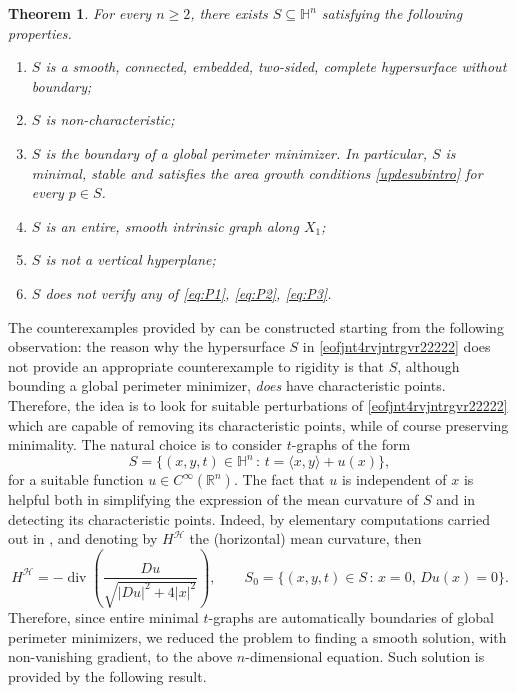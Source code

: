 \documentclass[11pt]{amsart}
\renewcommand{\geq}{\geqslant}
\newcommand{\hhh}{{\mathcal{H}}}
\newcommand{\rr}{{\mathbb{R}}}
\newcommand{\hh}{{\mathbb{H}}}
\DeclareMathOperator{\divv}{div}
\newtheorem{theorem}{Theorem}[section]
\theoremstyle{definition}
\theoremstyle{remark}
\numberwithin{equation}{section}
\begin{document}
\begin{theorem} \label{thm_no_rigidity}
    For every $n\geq 2$, there exists $S\subseteq\hh^n$ satisfying the following properties.     
    \begin{enumerate}
        \item $S$ is a smooth, connected, embedded, two-sided, complete hypersurface without boundary;
        \item $S$ is non-characteristic;
        \item $S$ is the boundary of a global perimeter minimizer. In particular, $S$ is minimal, stable and satisfies the area growth conditions \eqref{updesubintro} for every $p\in S$.
        \item $S$ is an entire, smooth intrinsic graph along $X_1$;
        \item $S$ is not a vertical hyperplane;
        \item $S$ does not verify any of \eqref{eq:P1}, \eqref{eq:P2}, \eqref{eq:P3}.
    \end{enumerate}
\end{theorem}
The counterexamples provided by  can be constructed starting from the following observation: the reason why the hypersurface $S$ in \eqref{eofjnt4rvjntrgvr22222} does not provide an appropriate counterexample to rigidity is that $S$, although bounding a global perimeter minimizer,  \emph{does} have characteristic points. Therefore, the idea is to look for suitable perturbations of \eqref{eofjnt4rvjntrgvr22222} which are capable of removing its characteristic points, while of course preserving minimality. The natural choice is to consider $t$-graphs of the form 
\begin{equation}\label{eofjnt4rvjntrgvr}
   S=\{(x,y,t)\in\hh^n\,:\,t=\langle x, y\rangle+u(x)\},
\end{equation}
for a suitable function $u\in C^\infty(\rr^n)$. The fact that $u$ is independent of $x$ is helpful both in simplifying the expression of the mean curvature of $S$ and in detecting its characteristic points. Indeed, by elementary computations carried out in , and denoting by $H^\hhh$ the (horizontal) mean curvature, then
\begin{equation*}
    H^\hhh=-\divv\left(\frac{Du}{\sqrt{|Du|^2+4|x|^2}}\right),\qquad  S_0=\{(x,y,t)\in S\,:\,x=0,\,Du(x)=0\}.
\end{equation*}
Therefore, since entire minimal $t$-graphs are automatically boundaries of global perimeter minimizers, we reduced the problem to finding a smooth solution, with non-vanishing gradient, to the above $n$-dimensional equation. Such solution is provided by the following result. 
\end{document}

